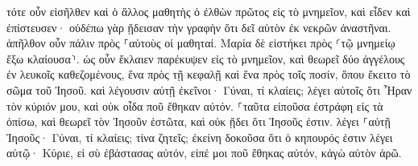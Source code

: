 \documentclass{openreader}
\begin{document}
τότε οὖν εἰσῆλθεν καὶ ὁ ἄλλος μαθητὴς ὁ ἐλθὼν πρῶτος εἰς τὸ μνημεῖον, καὶ εἶδεν καὶ ἐπίστευσεν· 
οὐδέπω γὰρ ᾔδεισαν τὴν γραφὴν ὅτι δεῖ αὐτὸν ἐκ νεκρῶν ἀναστῆναι. 
ἀπῆλθον οὖν πάλιν πρὸς ⸀αὑτοὺς οἱ μαθηταί. 
Μαρία δὲ εἱστήκει πρὸς ⸂τῷ μνημείῳ ἔξω κλαίουσα⸃. ὡς οὖν ἔκλαιεν παρέκυψεν εἰς τὸ μνημεῖον, 
καὶ θεωρεῖ δύο ἀγγέλους ἐν λευκοῖς καθεζομένους, ἕνα πρὸς τῇ κεφαλῇ καὶ ἕνα πρὸς τοῖς ποσίν, ὅπου ἔκειτο τὸ σῶμα τοῦ Ἰησοῦ. 
καὶ λέγουσιν αὐτῇ ἐκεῖνοι· Γύναι, τί κλαίεις; λέγει αὐτοῖς ὅτι Ἦραν τὸν κύριόν μου, καὶ οὐκ οἶδα ποῦ ἔθηκαν αὐτόν. 
⸀ταῦτα εἰποῦσα ἐστράφη εἰς τὰ ὀπίσω, καὶ θεωρεῖ τὸν Ἰησοῦν ἑστῶτα, καὶ οὐκ ᾔδει ὅτι Ἰησοῦς ἐστιν. 
λέγει ⸀αὐτῇ Ἰησοῦς· Γύναι, τί κλαίεις; τίνα ζητεῖς; ἐκείνη δοκοῦσα ὅτι ὁ κηπουρός ἐστιν λέγει αὐτῷ· Κύριε, εἰ σὺ ἐβάστασας αὐτόν, εἰπέ μοι ποῦ ἔθηκας αὐτόν, κἀγὼ αὐτὸν ἀρῶ. 
\end{document}
